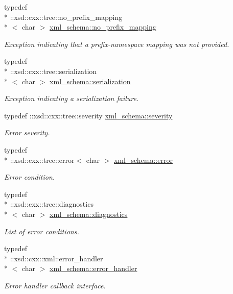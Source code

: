 \begin{DoxyCompactItemize}
typedef \\*
\-::xsd\-::cxx\-::tree\-::no\-\_\-prefix\-\_\-mapping\\*
$<$ char $>$ \hyperlink{namespacexml__schema_a03293581f2c90a05fbb910be49380e01}{xml\-\_\-schema\-::no\-\_\-prefix\-\_\-mapping}
\begin{DoxyCompactList}\small\item\em Exception indicating that a prefix-\/namespace mapping was not provided. \end{DoxyCompactList}\item 
typedef \\*
\-::xsd\-::cxx\-::tree\-::serialization\\*
$<$ char $>$ \hyperlink{namespacexml__schema_a40e04a11c9e6204762591b4de3755899}{xml\-\_\-schema\-::serialization}
\begin{DoxyCompactList}\small\item\em Exception indicating a serialization failure. \end{DoxyCompactList}\item 
typedef \-::xsd\-::cxx\-::tree\-::severity \hyperlink{namespacexml__schema_aaac8e21420b35e58ad94533db40ccf41}{xml\-\_\-schema\-::severity}
\begin{DoxyCompactList}\small\item\em Error severity. \end{DoxyCompactList}\item 
typedef \\*
\-::xsd\-::cxx\-::tree\-::error$<$ char $>$ \hyperlink{namespacexml__schema_a13e2122658f2abee3c2da9829f2de129}{xml\-\_\-schema\-::error}
\begin{DoxyCompactList}\small\item\em Error condition. \end{DoxyCompactList}\item 
typedef \\*
\-::xsd\-::cxx\-::tree\-::diagnostics\\*
$<$ char $>$ \hyperlink{namespacexml__schema_a62cc106990ec99fdaf2f3364d98cfabd}{xml\-\_\-schema\-::diagnostics}
\begin{DoxyCompactList}\small\item\em List of error conditions. \end{DoxyCompactList}\item 
typedef \\*
\-::xsd\-::cxx\-::xml\-::error\-\_\-handler\\*
$<$ char $>$ \hyperlink{namespacexml__schema_abdee01986b8e16f04af47dd12038261e}{xml\-\_\-schema\-::error\-\_\-handler}
\begin{DoxyCompactList}\small\item\em Error handler callback interface. \end{DoxyCompactList}\end{DoxyCompactItemize}
